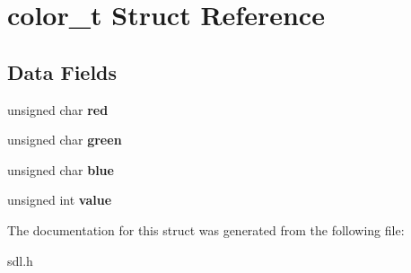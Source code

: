 \hypertarget{structcolor__t}{\section{color\-\_\-t Struct Reference}
\label{structcolor__t}
}
\subsection*{Data Fields}
\begin{DoxyCompactItemize}
\item 
\hypertarget{structcolor__t_a0122321b07bffb16f3a5cdd27922548c}{unsigned char {\bfseries red}}\label{structcolor__t_a0122321b07bffb16f3a5cdd27922548c}

\item 
\hypertarget{structcolor__t_a244bc64dc81180dd04a6c11311407256}{unsigned char {\bfseries green}}\label{structcolor__t_a244bc64dc81180dd04a6c11311407256}

\item 
\hypertarget{structcolor__t_a53125a3aec56167e405e8e5296862ef8}{unsigned char {\bfseries blue}}\label{structcolor__t_a53125a3aec56167e405e8e5296862ef8}

\item 
\hypertarget{structcolor__t_a2a5a27690c40c531d0a8385dc4f66a95}{unsigned int {\bfseries value}}\label{structcolor__t_a2a5a27690c40c531d0a8385dc4f66a95}

\end{DoxyCompactItemize}


The documentation for this struct was generated from the following file\-:\begin{DoxyCompactItemize}
\item 
sdl.\-h\end{DoxyCompactItemize}
